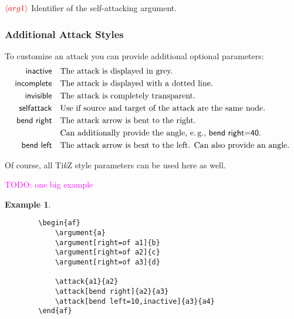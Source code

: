 \documentclass[headings=normal]{scrartcl}
\newcommand{\todo}[1]{\textcolor{magenta}{TODO: #1}} %
\newcommand{\tikzname}{Ti\emph{k}Z\xspace}
\newcommand{\opt}[2][red]{\ensuremath{\textcolor{#1}{\langle #2\rangle}}}
\newtheorem{example}{Example}
\newcommand{\makecmd}[1]{\textbackslash\hspace{-1ex}#1}
\newenvironment{command}[1]{
    \medskip\medskip
    \hspace{-1.5cm}{\ttfamily \makecmd{#1}}
    \begin{description}[labelindent=1.5cm,labelsep=0.5em, align=right]
}{%
    \end{description}
    \medskip
}
\begin{document}
    \begin{command}{
        selfattack\{\opt{arg1}\}
    }
        \item[\opt{arg1}] Identifier of the self-attacking argument.
    \end{command}
    
\subsubsection{Additional Attack Styles}
    To customize an attack you can provide additional optional parameters:
    \begin{align*}
        \mathsf{inactive} &\quad \text{The attack is displayed in grey.}\\
        \mathsf{incomplete} &\quad \text{The attack is displayed with a dotted line.}\\
        \mathsf{invisible} &\quad \text{The attack is completely transparent.}\\
        \mathsf{selfattack} &\quad \text{Use if source and target of the attack are the same node.}\\
        \mathsf{bend~right} &\quad \text{The attack arrow is bent to the right.}\\
        &\quad \text{Can additionally provide the angle, e.\,g., \textsf{bend~right=40}.}\\
        \mathsf{bend~left} &\quad \text{The attack arrow is bent to the left. Can also provide an angle.}
    \end{align*}
    
    Of course, all \tikzname style parameters can be used here as well.


    \todo{one big example}
    \begin{example}~

    \begin{minipage}{0.32\textwidth}
    \begin{center}
        \begin{af}
    
        \end{af}
    \end{center}
    \end{minipage}%
    \begin{minipage}{0.5\textwidth}
    \begin{verbatim}
        \begin{af}
            \argument{a}
            \argument[right=of a1]{b}
            \argument[right=of a2]{c}
            \argument[right=of a3]{d}
    
            \attack{a1}{a2}
            \attack[bend right]{a2}{a3}
            \attack[bend left=10,inactive]{a3}{a4}
        \end{af}
    \end{verbatim}
    \end{minipage}%
    
    \end{example}
\end{document}
